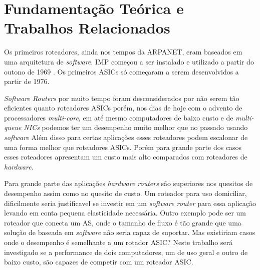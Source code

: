 \section{Fundamentação Teórica e Trabalhos Relacionados}
	Os primeiros roteadores, ainda nos tempos da ARPANET, eram baseados em uma arquitetura de \textit{software}. \ac{IMP} começou a ser instalado e utilizado a partir do outono de 1969 \cite{ARPA}. Os primeiros \acp{ASIC} só começaram a serem desenvolvidos a partir de 1976.

\textit{Software Routers} por muito tempo foram desconsiderados por não serem tão 
eficientes quanto roteadores ASICs porém, nos dias de hoje com o advento de processadores
\textit{multi-core}, em até mesmo computadores de baixo custo e de \textit{multi-queue NICs}
podemos ter um desempenho muito melhor que no passado usando \textit{software}\cite{linux}
Além disso para certas aplicações esses roteadores podem escalonar de uma forma melhor que roteadores ASICs. Porém para grande parte dos casos esses roteadores apresentam um custo mais alto comparados com roteadores de \textit{hardware}. 

Para grande parte das aplicações \textit{hardware routers} são superiores nos quesitos de desempenho assim como no quesito de custo. Um roteador para uso domiciliar, dificilmente seria justificavel se investir em um \textit{software router} para essa aplicação levando em conta pequena elasticidade necessária. Outro exemplo pode ser um roteador que conecta um \ac{AS}, onde o tamanho de fluxo é tão grande que uma solução de baseada em \textit{software} não seria capaz de suportar. Mas existiriam casos onde o desempenho é semelhante a um rotador \ac{ASIC}? Neste trabalho será investigado se a performance de dois computadores, um de uso geral e outro de baixo custo, são capazes de competir com um roteador ASIC.
